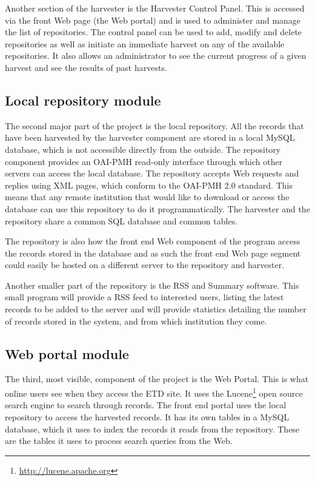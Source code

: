 \documentclass[a4paper,11pt]{article}
\begin{document}
Another section of the harvester is the Harvester Control Panel. This is accessed via the front Web page (the Web portal) and is used to administer and manage the list of repositories. The control panel can be used to add, modify and delete repositories as well as initiate an immediate harvest on any of the available repositories. It also allows an administrator to see the current progress of a given harvest and see the results of past harvests.

\subsection{Local repository module}
\label{sec:general_overview:local_repository_module}

The second major part of the project is the local repository. All the records that have been harvested by the harvester component are stored in a local MySQL database, which is not accessible directly from the outside. The repository component provides an OAI-PMH read-only interface through which other servers can access the local database. The repository accepts Web requests and replies using XML pages, which conform to the OAI-PMH 2.0 standard. This means that any remote institution that would like to download or access the database can use this repository to do it programmatically. The harvester and the repository share a common SQL database and common tables.

The repository is also how the front end Web component of the program access the records stored in the database and as such the front end Web page segment could easily be hosted on a different server to the repository and harvester.

Another smaller part of the repository is the RSS and Summary software. This small program will provide a RSS feed to interested users, listing the latest records to be added to the server and will provide statistics detailing the number of records stored in the system, and from which institution they come.

\subsection{Web portal module}
\label{sec:general_overview:web_portal_module}

The third, most visible, component of the project is the Web Portal. This is what online users see when they access the ETD site. It uses the Lucene\footnote{\url{http://lucene.apache.org}} open source search engine to search through records. The front end portal uses the local repository to access the harvested records. It has its own tables in a MySQL database, which it uses to index the records it reads from the repository. These are the tables it uses to process search queries from the Web.
\end{document}
